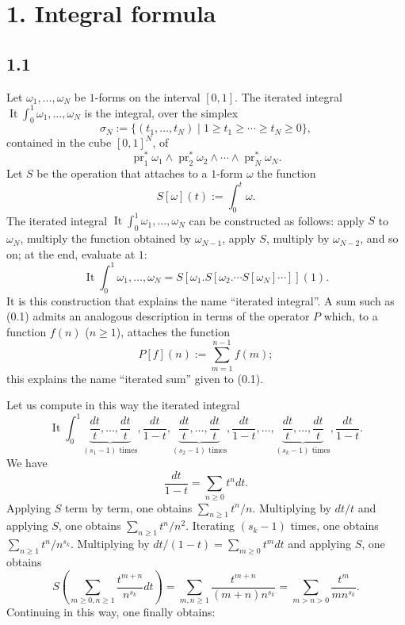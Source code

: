 \documentclass[11pt]{article}
\newcommand{\It}{\operatorname{It}}
\begin{document}
\section*{1. Integral formula}

\subsection*{1.1}
Let $\omega_1,\ldots,\omega_N$ be $1$-forms on the interval $[0,1]$.
The iterated integral $\It\int_0^1\omega_1,\ldots,\omega_N$ is the integral, over the simplex
\begin{equation}
\sigma_N:=\{(t_1,\ldots,t_N)\mid 1\geq t_1\geq\cdots\geq t_N\geq 0\},
\tag{1.1.1}
\end{equation}
contained in the cube $[0,1]^N$, of
\[
 \operatorname{pr}_1^*\omega_1\wedge \operatorname{pr}_2^*\omega_2\wedge\cdots\wedge \operatorname{pr}_N^*\omega_N.
\]
Let $S$ be the operation that attaches to a $1$-form $\omega$ the function
\[
 S[\omega](t):=\int_0^t\omega.
\]
The iterated integral $\It\int_0^1\omega_1,\ldots,\omega_N$ can be constructed as follows: apply $S$ to $\omega_N$, multiply the function obtained by $\omega_{N-1}$, apply $S$, multiply by $\omega_{N-2}$, and so on; at the end, evaluate at $1$:
\begin{equation}
\It\int_0^1\omega_1,\ldots,\omega_N
 = S[\omega_1.S[\omega_2.\cdots S[\omega_N]\cdots]](1).
\tag{1.1.2}
\end{equation}
It is this construction that explains the name ``iterated integral''.
A sum such as (0.1) admits an analogous description in terms of the operator $P$ which, to a function $f(n)$ ($n\geq1$), attaches the function
\[
 P[f](n):=\sum_{m=1}^{n-1}f(m);
\]
this explains the name ``iterated sum'' given to (0.1).

Let us compute in this way the iterated integral
\begin{equation}
\It\int_0^1
 \underbrace{\frac{dt}{t},\ldots,\frac{dt}{t}}_{(s_1-1)\text{ times}},
 \frac{dt}{1-t},
 \underbrace{\frac{dt}{t},\ldots,\frac{dt}{t}}_{(s_2-1)\text{ times}},
 \frac{dt}{1-t},\ldots,
 \underbrace{\frac{dt}{t},\ldots,\frac{dt}{t}}_{(s_k-1)\text{ times}},
 \frac{dt}{1-t}.
\tag{1.1.3}
\end{equation}
We have
\[
 \frac{dt}{1-t}=\sum_{n\geq0}t^n dt.
\]
Applying $S$ term by term, one obtains $\sum_{n\geq1}t^n/n$.
Multiplying by $dt/t$ and applying $S$, one obtains $\sum_{n\geq1}t^n/n^2$.
Iterating $(s_k-1)$ times, one obtains $\sum_{n\geq1}t^n/n^{s_k}$.
Multiplying by $dt/(1-t)=\sum_{m\geq0}t^m dt$ and applying $S$, one obtains
\[
S\left(\sum_{m\geq0,n\geq1}\frac{t^{m+n}}{n^{s_k}}dt\right)
 =\sum_{m,n\geq1}\frac{t^{m+n}}{(m+n)n^{s_k}}
 =\sum_{m>n>0}\frac{t^m}{mn^{s_k}}.
\]
Continuing in this way, one finally obtains:
\end{document}
